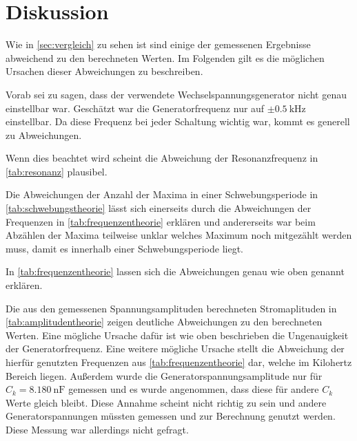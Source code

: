 \section{Diskussion}
\label{sec:Diskussion}


Wie in \autoref{sec:vergleich} zu sehen ist sind einige der gemessenen Ergebnisse abweichend zu den berechneten Werten. Im Folgenden gilt es die möglichen Ursachen dieser Abweichungen zu beschreiben.

Vorab sei zu sagen, dass der verwendete Wechselspannungsgenerator nicht genau einstellbar war. Geschätzt war die Generatorfrequenz nur auf $\pm \SI{0.5}{\kilo\hertz}$ einstellbar. 
Da diese Frequenz bei jeder Schaltung wichtig war, kommt es generell zu Abweichungen.

Wenn dies beachtet wird scheint die Abweichung der Resonanzfrequenz in \autoref{tab:resonanz} plausibel.

Die Abweichungen der Anzahl der Maxima in einer Schwebungsperiode in \autoref{tab:schwebungstheorie} lässt sich einerseits durch die Abweichungen der Frequenzen in \autoref{tab:frequenzentheorie} erklären und andererseits war beim Abzählen der Maxima teilweise unklar welches Maximum noch mitgezählt werden muss, damit es innerhalb einer Schwebungsperiode liegt.

In \autoref{tab:frequenzentheorie} lassen sich die Abweichungen genau wie oben genannt erklären.

Die aus den gemessenen Spannungsamplituden berechneten Stromaplituden in \autoref{tab:amplitudentheorie} zeigen deutliche Abweichungen zu den berechneten Werten.
Eine mögliche Ursache dafür ist wie oben beschrieben die Ungenauigkeit der Generatorfrequenz.
Eine weitere mögliche Ursache stellt die Abweichung der hierfür genutzten Frequenzen aus \autoref{tab:frequenzentheorie} dar, welche im Kilohertz Bereich liegen.
Außerdem wurde die Generatorspannungsamplitude nur für $C_k = \SI{8.180}{\nano\farad}$ gemessen und es wurde angenommen, dass diese für andere $C_k$ Werte gleich bleibt. 
Diese Annahme scheint nicht richtig zu sein und andere Generatorspannungen müssten gemessen und zur Berechnung genutzt werden. Diese Messung war allerdings nicht gefragt.